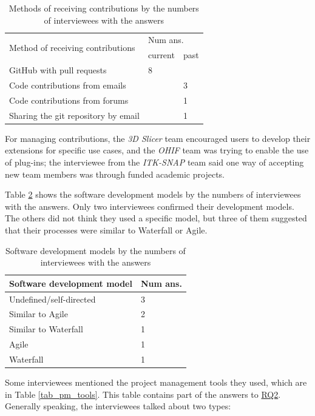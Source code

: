 \documentclass[final, 3p, times, authoryear]{elsarticle}
\begin{document}
\begin{table}[ht]
\centering
\begin{tabular}{lll}
\hline
\multirow{2}{*}{Method of receiving contributions} & \multicolumn{2}{l}{Num ans.} \\ \cline{2-3} 
 & current & past \\ \hline
GitHub with pull requests & 8 & \\
Code contributions from emails & & 3 \\
Code contributions from forums & & 1 \\
Sharing the git repository by email & & 1 \\ \hline
\end{tabular}
\caption{\label{tab_method_receive_contributions}Methods of receiving
contributions by the numbers of interviewees with the answers}
\end{table}

For managing contributions, the \textit{3D Slicer} team encouraged users to
develop their extensions for specific use cases, and the \textit{OHIF} team was
trying to enable the use of plug-ins; the interviewee from the \textit{ITK-SNAP}
team said one way of accepting new team members was through funded academic
projects.

Table \ref{tab_developmen_models} shows the software development models by the
numbers of interviewees with the answers. Only two interviewees confirmed their
development models. The others did not think they used a specific model, but
three of them suggested that their processes were similar to Waterfall or Agile.

\begin{table}[ht]
\centering
\begin{tabular}{ll}
\hline
Software development model & Num ans. \\ \hline
Undefined/self-directed & 3 \\
Similar to Agile & 2 \\
Similar to Waterfall & 1 \\
Agile & 1 \\
Waterfall & 1 \\ \hline
\end{tabular}
\caption{\label{tab_developmen_models}Software development models by the numbers
of interviewees with the answers}
\end{table}

Some interviewees mentioned the project management tools they used, which are in
Table \ref{tab_pm_tools}. This table contains part of the answers to
\hyperlink{rq2}{RQ2}. Generally speaking, the interviewees talked about two
types:
\end{document}
